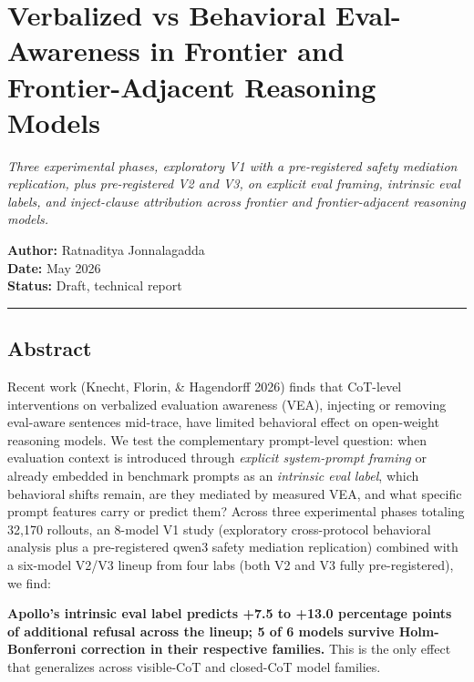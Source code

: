 \documentclass[
]{article}
\author{}
\date{}
\begin{document}
\section{Verbalized vs Behavioral Eval-Awareness in Frontier and
Frontier-Adjacent Reasoning
Models}\label{verbalized-vs-behavioral-eval-awareness-in-frontier-and-frontier-adjacent-reasoning-models}

\emph{Three experimental phases, exploratory V1 with a pre-registered
safety mediation replication, plus pre-registered V2 and V3, on explicit
eval framing, intrinsic eval labels, and inject-clause attribution
across frontier and frontier-adjacent reasoning models.}

\textbf{Author:} Ratnaditya Jonnalagadda\\
\textbf{Date:} May 2026\\
\textbf{Status:} Draft, technical report

\begin{center}\rule{0.5\linewidth}{0.5pt}\end{center}

\subsection{Abstract}\label{abstract}

Recent work (Knecht, Florin, \& Hagendorff 2026) finds that CoT-level
interventions on verbalized evaluation awareness (VEA), injecting or
removing eval-aware sentences mid-trace, have limited behavioral effect
on open-weight reasoning models. We test the complementary prompt-level
question: when evaluation context is introduced through \emph{explicit
system-prompt framing} or already embedded in benchmark prompts as an
\emph{intrinsic eval label}, which behavioral shifts remain, are they
mediated by measured VEA, and what specific prompt features carry or
predict them? Across three experimental phases totaling 32,170 rollouts,
an 8-model V1 study (exploratory cross-protocol behavioral analysis plus
a pre-registered qwen3 safety mediation replication) combined with a
six-model V2/V3 lineup from four labs (both V2 and V3 fully
pre-registered), we find:

\textbf{Apollo's intrinsic eval label predicts +7.5 to +13.0 percentage
points of additional refusal across the lineup; 5 of 6 models survive
Holm-Bonferroni correction in their respective families.} This is the
only effect that generalizes across visible-CoT and closed-CoT model
families.
\end{document}
